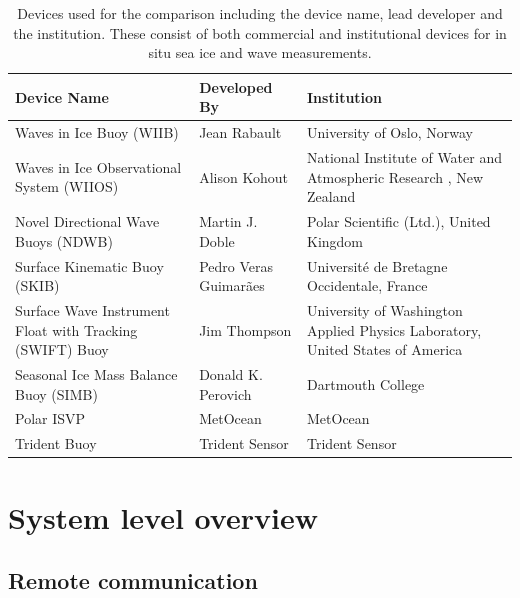 \begin{center}{\setlength{\extrarowheight}{5pt}%
		\begin{longtable}[H]{>{\RaggedRight}m{}>{\RaggedRight}m{} >{\RaggedRight}m{}}
			\caption{Devices used for the comparison including the device name, lead developer and the institution. These consist of both commercial and institutional devices for in situ sea ice and wave measurements.}\\
			\hline
			\label{tab:device_list}
			\textbf{Device Name} & \textbf{Developed By} & \textbf{Institution}\\
			\hline
			\hline
			Waves in Ice Buoy (WIIB) & Jean Rabault & University of Oslo, Norway \cite{rabault2019open} \\
			\hline
			Waves in Ice Observational System (WIIOS) & Alison Kohout & National Institute of Water and Atmospheric Research \cite{kohout2015device}, New Zealand \\
			\hline
			Novel Directional Wave Buoys (NDWB) & Martin J. Doble &  Polar Scientific (Ltd.), United Kingdom \cite{doble2017robust}\\
			\hline
			Surface Kinematic Buoy (SKIB) & Pedro Veras Guimarães & Université de Bretagne Occidentale, France \cite{guimaraes2018surface} \\
			\hline
			Surface Wave Instrument Float with Tracking (SWIFT) Buoy & Jim Thompson & University of Washington Applied Physics Laboratory, United States of America \cite{thomson2012wave}\\
			\hline
			Seasonal Ice Mass Balance Buoy (SIMB) & Donald K. Perovich & Dartmouth College \cite{planck2019evolution} \\
			\hline
			Polar ISVP & MetOcean & MetOcean \\
			\hline
			Trident Buoy & Trident Sensor & Trident Sensor \\
			\hline
			\hline
		\end{longtable}
	}
\end{center}


\section{System level overview}

\subsection{Remote communication}
\label{ch2:sec_remote}

